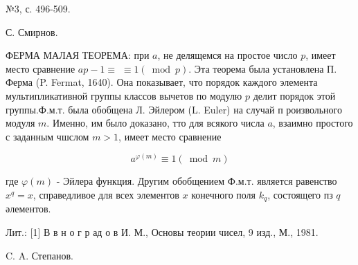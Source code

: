\documentclass[10pt]{article}
\begin{document}
№3, с. 496-509.

С. Смирнов.



ФЕРМА МАЛАЯ ТЕОРЕМА: при $a$, не делящемся на простое число $p$, имеет место сравнение $a p-1 \equiv$ $\equiv 1(\bmod p)$. Эта теорема была установлена П. Ферма (P. Fermat, 1640). Она показывает, что порядок каждого элемента мультипликативной группы классов вычетов по модулю $p$ делит порядок этой группы.Ф.м.т. была обобщена Л. Эйлером (L. Euler) на случай п роизвольного модуля $m$. Именно, им было доказано, тто для всякого числа $a$, взаимно простого с заданным чшслом $m>1$, имеет место сравнение



\[

a^{\varphi(m)} \equiv 1(\bmod m)

\]



где $\varphi(m)$ - Эйлера функция. Другим обобщением Ф.м.т. является равенство $x^{q}=x$, справедливое для всех элементов $x$ конечного поля $k_{q}$, состоящего пз $q$ әлементов.



Лит.: [1] В в н о г р ад о в И. М., Основы теории чисел, 9 изд., М., 1981.



C. A. Степанов.
\end{document}
